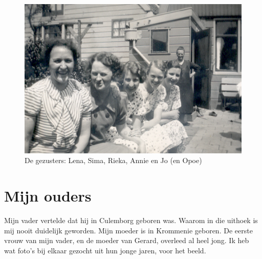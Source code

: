 \documentclass[12pt,twoside]{memoir}
\begin{document}
\begin{figure}
\includegraphics[width=\textwidth]{img/ch3/Zussen}
\caption*{\footnotesize De gezusters: Lena, Sima, Rieka, Annie en Jo (en Opoe)}
\end{figure}

\chapter{Mijn ouders} %
\label{cha:ouders}

Mijn vader vertelde dat hij in Culemborg geboren was. Waarom in die uithoek is mij nooit duidelijk geworden. Mijn moeder is in Krommenie geboren. De eerste vrouw van mijn vader, en de moeder van Gerard, overleed al heel jong. Ik heb wat foto's bij elkaar gezocht uit hun jonge jaren, voor het beeld.
\end{document}
